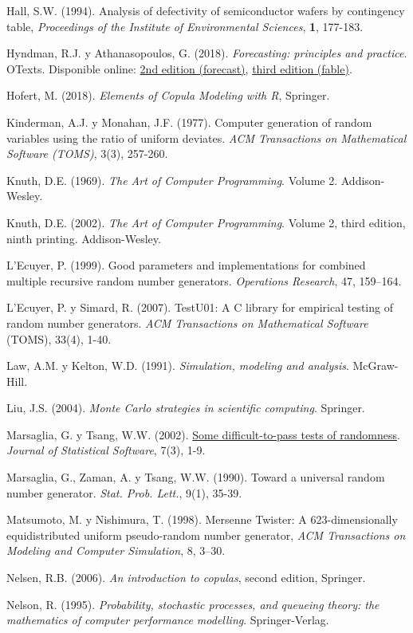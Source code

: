 \documentclass[
]{book}
\theoremstyle{break}
\theoremstyle{nonumberplain}
\begin{document}
Hall, S.W. (1994). Analysis of defectivity of semiconductor wafers by contingency table, \emph{Proceedings of the Institute of Environmental Sciences}, \textbf{1}, 177-183.

Hyndman, R.J. y Athanasopoulos, G. (2018). \emph{Forecasting: principles and practice}. OTexts.
Disponible online: \href{https://otexts.com/fpp2}{2nd edition (forecast)}, \href{https://otexts.com/fpp3}{third edition (fable)}.

Hofert, M. (2018). \emph{Elements of Copula Modeling with R}, Springer.

Kinderman, A.J. y Monahan, J.F. (1977). Computer generation of random variables using the ratio of uniform deviates. \emph{ACM Transactions on Mathematical Software (TOMS)}, 3(3), 257-260.

Knuth, D.E. (1969). \emph{The Art of Computer Programming}. Volume 2. Addison-Wesley.

Knuth, D.E. (2002). \emph{The Art of Computer Programming}. Volume 2, third edition, ninth printing. Addison-Wesley.

L'Ecuyer, P. (1999). Good parameters and implementations for combined multiple recursive random number generators. \emph{Operations Research}, 47, 159--164.

L'Ecuyer, P. y Simard, R. (2007). TestU01: A C library for empirical testing of random number generators. \emph{ACM Transactions on Mathematical Software} (TOMS), 33(4), 1-40.

Law, A.M. y Kelton, W.D. (1991). \emph{Simulation, modeling and analysis}. McGraw-Hill.

Liu, J.S. (2004). \emph{Monte Carlo strategies in scientific computing}. Springer.

Marsaglia, G. y Tsang, W.W. (2002). \href{http://www.jstatsoft.org/v07/i03}{Some difficult-to-pass tests of randomness}. \emph{Journal of Statistical Software}, 7(3), 1-9.

Marsaglia, G., Zaman, A. y Tsang, W.W. (1990). Toward a universal random number generator. \emph{Stat. Prob. Lett.}, 9(1), 35-39.

Matsumoto, M. y Nishimura, T. (1998). Mersenne Twister: A 623-dimensionally equidistributed uniform pseudo-random number generator, \emph{ACM Transactions on Modeling and Computer Simulation}, 8, 3--30.

Nelsen, R.B. (2006). \emph{An introduction to copulas}, second edition, Springer.

Nelson, R. (1995). \emph{Probability, stochastic processes, and queueing theory: the mathematics of computer performance modelling}. Springer-Verlag.
\end{document}
